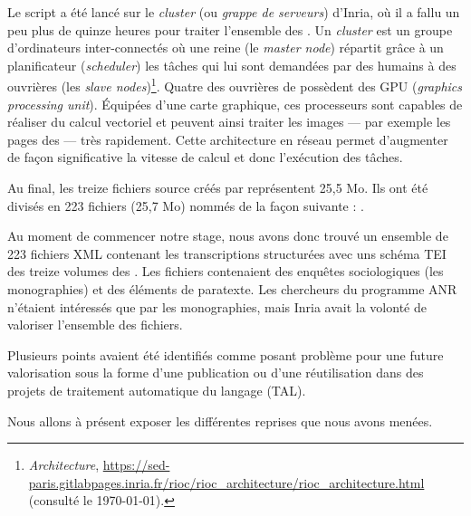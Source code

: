 Le script \lse{} a été lancé sur le \textit{cluster} (ou \textit{grappe de serveurs}) \rioc{} d'Inria, où il a fallu un peu plus de quinze heures pour traiter l'ensemble des \odm. Un \textit{cluster} est un groupe d'ordinateurs inter-connectés où une \og reine \fg{} (le \textit{master node}) répartit grâce à un \og planificateur \fg{} (\textit{scheduler}) les tâches qui lui sont demandées par des humains à des \og ouvrières \fg{} (les \textit{slave nodes})\footnote{\textit{\rioc{} Architecture}, \url{https://sed-paris.gitlabpages.inria.fr/rioc/rioc_architecture/rioc_architecture.html} (consulté le \today).}. Quatre des \og ouvrières \fg{} de \rioc{} possèdent des GPU (\textit{graphics processing unit}). Équipées d'une carte graphique, ces processeurs sont capables de réaliser du calcul vectoriel et peuvent ainsi traiter les images --- par exemple les pages des \odm{} --- très rapidement. Cette architecture en réseau permet d'augmenter de façon significative la vitesse de calcul et donc l'exécution des tâches.

Au final, les treize fichiers source créés par \lse{} représentent 25,5 Mo. Ils ont été divisés en 223 fichiers (25,7 Mo) nommés de la façon suivante : .

\clearpage


Au moment de commencer notre stage, nous avons donc trouvé un ensemble de 223 fichiers XML contenant les transcriptions structurées avec uns schéma TEI des treize volumes des \odm. Les fichiers contenaient des enquêtes sociologiques (les monographies) et des éléments de paratexte. Les chercheurs du programme ANR \timeus{} n'étaient intéressés que par les monographies, mais Inria avait la volonté de valoriser l'ensemble des fichiers.

Plusieurs points avaient été identifiés comme posant problème pour une future valorisation sous la forme d'une publication ou d'une réutilisation dans des projets de traitement automatique du langage (TAL).

Nous allons à présent exposer les différentes reprises que nous avons menées.

